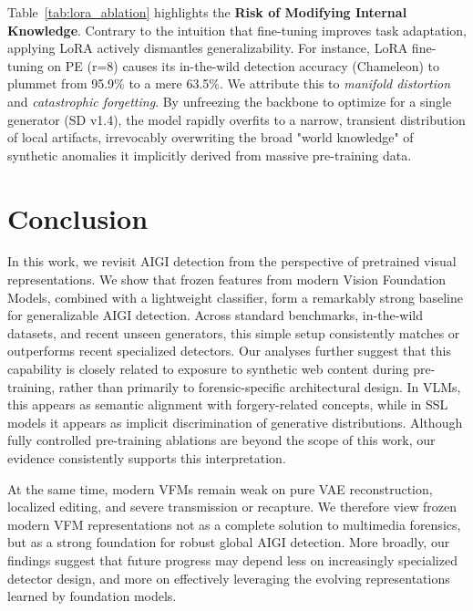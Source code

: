 \documentclass[sigconf,screen]{acmart}
\theoremstyle{plain}
\theoremstyle{definition}
\theoremstyle{remark}
\begin{document}
Table~\ref{tab:lora_ablation} highlights the \textbf{Risk of Modifying Internal Knowledge}. Contrary to the intuition that fine-tuning improves task adaptation, applying LoRA actively dismantles generalizability. For instance, LoRA fine-tuning on PE (r=8) causes its in-the-wild detection accuracy (Chameleon) to plummet from 95.9\% to a mere 63.5\%. We attribute this to \textit{manifold distortion} and \textit{catastrophic forgetting}. By unfreezing the backbone to optimize for a single generator (SD v1.4), the model rapidly overfits to a narrow, transient distribution of local artifacts, irrevocably overwriting the broad "world knowledge" of synthetic anomalies it implicitly derived from massive pre-training data.

\section{Conclusion}
\label{sec:conclusion}
In this work, we revisit AIGI detection from the perspective of pretrained visual representations. We show that frozen features from modern Vision Foundation Models, combined with a lightweight classifier, form a remarkably strong baseline for generalizable AIGI detection. Across standard benchmarks, in-the-wild datasets, and recent unseen generators, this simple setup consistently matches or outperforms recent specialized detectors. Our analyses further suggest that this capability is closely related to exposure to synthetic web content during pre-training, rather than primarily to forensic-specific architectural design. In VLMs, this appears as semantic alignment with forgery-related concepts, while in SSL models it appears as implicit discrimination of generative distributions. Although fully controlled pre-training ablations are beyond the scope of this work, our evidence consistently supports this interpretation.

At the same time, modern VFMs remain weak on pure VAE reconstruction, localized editing, and severe transmission or recapture. We therefore view frozen modern VFM representations not as a complete solution to multimedia forensics, but as a strong foundation for robust global AIGI detection. More broadly, our findings suggest that future progress may depend less on increasingly specialized detector design, and more on effectively leveraging the evolving representations learned by foundation models.



\end{document}
